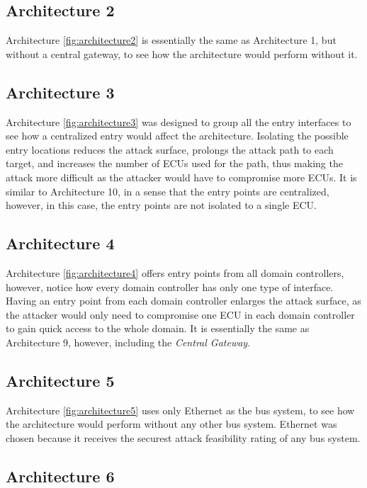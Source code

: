 \subsection{Architecture 2}
\label{subsec:arch2}

Architecture \ref{fig:architecture2} is essentially the same as Architecture 1, 
but without a central gateway, to see how the architecture would perform without it.

\subsection{Architecture 3}
\label{subsec:arch3}

Architecture \ref{fig:architecture3} was designed to group all the entry interfaces to see how a centralized entry would affect the architecture. 
Isolating the possible entry locations reduces the attack surface, prolongs the attack path to each target, 
and increases the number of ECUs used for the path, thus making the attack more difficult as the attacker would have to compromise more ECUs. 
It is similar to Architecture 10, in a sense that the entry points are centralized, however, in this case, the entry points are not isolated to a single ECU.

\subsection{Architecture 4}
\label{subsec:arch4}

Architecture \ref{fig:architecture4} offers entry points from all domain controllers, 
however, notice how every domain controller has only one type of interface. 
Having an entry point from each domain controller enlarges the attack surface, 
as the attacker would only need to compromise one ECU in each domain controller to gain quick access to the whole domain. 
It is essentially the same as Architecture 9, however, including the \textit{Central Gateway}.

\subsection{Architecture 5}
\label{subsec:arch5}

Architecture \ref{fig:architecture5} uses only Ethernet as the bus system, 
to see how the architecture would perform without any other bus system. 
Ethernet was chosen because it receives the securest attack feasibility rating of any bus system.

\subsection{Architecture 6}
\label{subsec:arch6}

